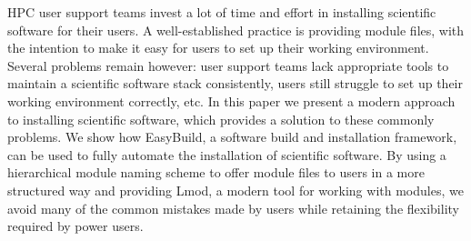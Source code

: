 
HPC user support teams invest a lot of time and effort in installing scientific
software for their users. A well-established practice is providing module files,
with the intention to make it easy for users to set up their working environment.
Several problems remain however: user support teams lack appropriate tools to maintain a
scientific software stack consistently, users still struggle to set up their working
environment correctly, etc.
In this paper we present a modern approach to installing scientific software, which provides
a solution to these commonly problems. We show how EasyBuild, a software build and
installation framework, can be used to fully automate the installation of scientific software.
By using a hierarchical module naming scheme to offer module files to users in a more structured
way and providing Lmod, a modern tool for working with modules, we avoid many of the common
mistakes made by users while retaining the flexibility required by power users. 
